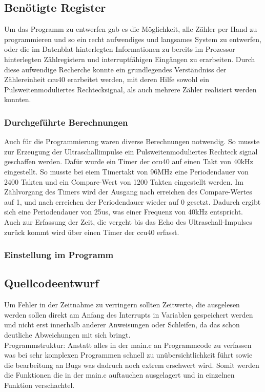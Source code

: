 \subsection{Benötigte Register}
Um das Programm zu entwerfen gab es die Möglichkeit, alle Zähler per Hand zu programmieren und so ein recht aufwendiges und langsames System zu entwerfen, oder die im Datenblat hinterlegten Informationen zu bereits im Prozessor hinterlegten Zählregistern und interruptfähigen Eingängen zu erarbeiten. Durch diese aufwendige Recherche konnte ein grundlegendes Verständniss der Zählereinheit ccu40 erarbeitet werden, mit deren Hilfe sowohl ein Pulsweitenmoduliertes Rechtecksignal, als auch mehrere Zähler realisiert werden konnten.

\subsubsection{Durchgeführte Berechnungen}
Auch für die Programmierung waren diverse Berechnungen notwendig. So musste zur Erzeugung der Ultraschallimpulse ein Pulsweitenmoduliertes Rechteck signal geschaffen werden. Dafür wurde ein Timer der ccu40 auf einen Takt von 40kHz eingestellt. So musste bei eiem Timertakt von 96MHz eine Periodendauer von 2400 Takten und ein Compare-Wert von 1200 Takten eingestellt werden. Im Zählvorgang des Timers wird der Ausgang nach erreichen des Compare-Wertes auf 1, und nach erreichen der Periodendauer wieder auf 0 gesetzt. Dadurch ergibt sich eine Periodendauer von 25us, was einer Frequenz von 40kHz entspricht.\\
Auch zur Erfassung der Zeit, die vergeht bis das Echo des Ultraschall-Impulses zurück kommt wird über einen Timer der ccu40 erfasst. 

\subsubsection{Einstellung im Programm}

\subsection{Quellcodeentwurf}
Um Fehler in der Zeitnahme zu verringern sollten Zeitwerte, die ausgelesen werden sollen direkt am Anfang des Interrupts in Variablen gespeichert werden und nicht erst innerhalb anderer Anweisungen oder Schleifen, da das schon deutliche Abweichungen mit sich bringt.\\

Programmstruktur:
Anstatt alles in der main.c an Programmcode zu verfassen was bei sehr komplexen Programmen schnell zu unübersichtlichkeit führt sowie die bearbeitung an Bugs was dadruch noch extrem erschwert wird. Somit werden die Funktionen die in der main.c auftauchen ausgelagert und in einzelnen Funktion verschachtel. \\

